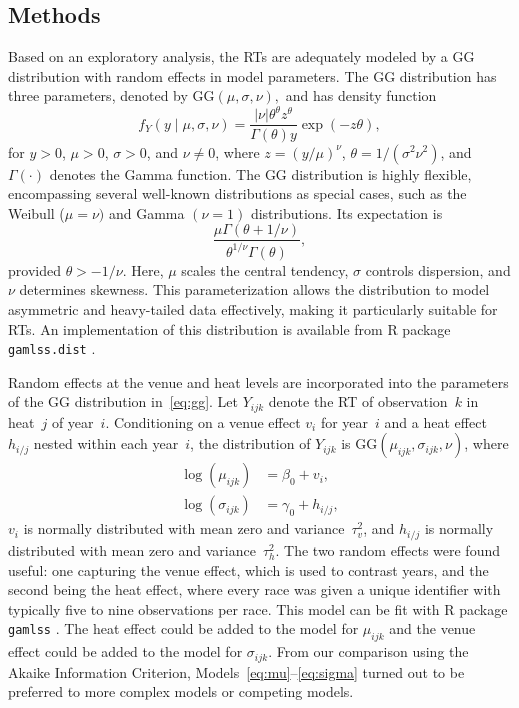 \documentclass[12pt, letterpaper]{article}
\begin{document}
\subsection{Methods}
\label{sec:methods_barrier}


Based on an exploratory analysis, the RTs are adequately
modeled by a GG distribution with random effects in
model parameters. The GG distribution has three parameters, denoted by
$\text{GG}(\mu, \sigma, \nu),$ and has density function
\begin{equation}
  \label{eq:gg}
f_Y(y \mid \mu, \sigma, \nu) =
\frac{|\nu| \theta^\theta z^{\theta}}{\Gamma(\theta) y}
\exp\left(-z \theta\right),
\end{equation}
for $y > 0$, $\mu > 0$, $\sigma > 0$, and $\nu \neq 0$,
where $z = (y / \mu)^\nu$,
$\theta = 1 / (\sigma^2 \nu^2)$, and
$\Gamma(\cdot)$ denotes the Gamma function.
The GG distribution is highly flexible, encompassing several
well-known distributions as special cases, such as the
Weibull ($\mu = \nu)$ and  Gamma $(\nu = 1)$ distributions.
Its expectation is
\[
  \frac{\mu \Gamma(\theta + 1 / \nu)}
  {\theta^{1 / \nu} \Gamma(\theta)},
\]
provided $\theta > -1 / \nu$. Here,
$\mu$ scales the central tendency, $\sigma$ controls
dispersion, and $\nu$ determines skewness. This parameterization allows
the distribution to model asymmetric and heavy-tailed data effectively, making
it particularly suitable for RTs.
An implementation of this distribution is available from R package
\texttt{gamlss.dist} \citep{rigby2019distributions}.


Random effects at the venue and heat levels are incorporated into the
parameters of the GG distribution in~\eqref{eq:gg}.
Let $Y_{ijk}$ denote the RT of observation~$k$ in heat~$j$
of year~$i$. Conditioning on a venue effect $v_i$ for year~$i$
and a heat effect $h_{i/j}$ nested within each year~$i$, the
distribution of $Y_{ijk}$ is
$\text{GG}(\mu_{ijk}, \sigma_{ijk}, \nu)$, where
\begin{align}
\log(\mu_{ijk}) &= \beta_0 + v_i , \label{eq:mu}\\
\log(\sigma_{ijk}) &= \gamma_0 + h_{i/j} , \label{eq:sigma}
\end{align}
$v_i$ is normally distributed with mean zero and
variance~$\tau_v^2$, and $h_{i/j}$ is normally distributed with mean
zero and variance~$\tau_h^2$.
The two random effects were found useful: one 
capturing the venue effect, which is used to contrast years, and the 
second being the heat effect, where every race was given a unique 
identifier with typically five to nine observations per race.
This model can be fit with R package \texttt{gamlss} 
\citep{stasinopoulos2008generalized}. The heat effect could be added
to the model for $\mu_{ijk}$ and the venue effect could be added to 
the model for $\sigma_{ijk}$. From our comparison using the Akaike 
Information Criterion, Models~\eqref{eq:mu}--\eqref{eq:sigma} turned 
out to be preferred to more complex models or competing models.
\end{document}
